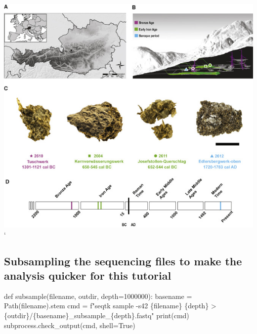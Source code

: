\documentclass[
  letterpaper,
]{book}
\newenvironment{Shaded}{}{}
\newcommand{\BuiltInTok}[1]{\textcolor[rgb]{0.84,0.23,0.29}{#1}}
\newcommand{\DecValTok}[1]{\textcolor[rgb]{0.00,0.36,0.77}{#1}}
\newcommand{\KeywordTok}[1]{\textcolor[rgb]{0.84,0.23,0.29}{#1}}
\newcommand{\NormalTok}[1]{\textcolor[rgb]{0.14,0.16,0.18}{#1}}
\newcommand{\OperatorTok}[1]{\textcolor[rgb]{0.14,0.16,0.18}{#1}}
\newcommand{\SpecialCharTok}[1]{\textcolor[rgb]{0.00,0.36,0.77}{#1}}
\newcommand{\SpecialStringTok}[1]{\textcolor[rgb]{0.01,0.18,0.38}{#1}}
\newcommand{\VariableTok}[1]{\textcolor[rgb]{0.89,0.38,0.04}{#1}}
\begin{document}
\includegraphics{assets/images/chapters/taxonomic-profiling/1-s2.0-S0960982221012719-gr1.jpg}`

\hypertarget{subsampling-the-sequencing-files-to-make-the-analysis-quicker-for-this-tutorial}{%
\subsection{Subsampling the sequencing files to make the analysis
quicker for this
tutorial}\label{subsampling-the-sequencing-files-to-make-the-analysis-quicker-for-this-tutorial}}

\begin{Shaded}
\begin{Highlighting}[]
\KeywordTok{def}\NormalTok{ subsample(filename, outdir, depth}\OperatorTok{=}\DecValTok{1000000}\NormalTok{):}
\NormalTok{    basename }\OperatorTok{=}\NormalTok{ Path(filename).stem}
\NormalTok{    cmd }\OperatorTok{=} \SpecialStringTok{f"seqtk sample {-}s42 }\SpecialCharTok{\{}\NormalTok{filename}\SpecialCharTok{\}}\SpecialStringTok{ }\SpecialCharTok{\{}\NormalTok{depth}\SpecialCharTok{\}}\SpecialStringTok{ \textgreater{} }\SpecialCharTok{\{}\NormalTok{outdir}\SpecialCharTok{\}}\SpecialStringTok{/}\SpecialCharTok{\{}\NormalTok{basename}\SpecialCharTok{\}}\SpecialStringTok{\_subsample\_}\SpecialCharTok{\{}\NormalTok{depth}\SpecialCharTok{\}}\SpecialStringTok{.fastq"}
    \BuiltInTok{print}\NormalTok{(cmd)}
\NormalTok{    subprocess.check\_output(cmd, shell}\OperatorTok{=}\VariableTok{True}\NormalTok{)}
\end{Highlighting}
\end{Shaded}
\end{document}
